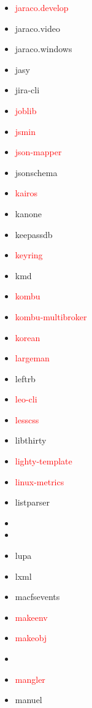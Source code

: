 \documentclass{l4proj}
\begin{document}
\begin{appendices}
{\begin{itemize}
\item\textcolor{red}{jaraco.develop}
\item jaraco.video
\item jaraco.windows
\item jasy
\item jira-cli
\end{itemize}
}%
\clearpage
\noindent\parbox[t]{0.32\textwidth}{\raggedright%
\begin{itemize}
\item\textcolor{red}{joblib}
\item\textcolor{red}{jsmin}
\item\textcolor{red}{json-mapper}
\item jsonschema
\item\textcolor{red}{kairos}
\item kanone
\item keepassdb
\item\textcolor{red}{keyring}
\item kmd
\item\textcolor{red}{kombu}
\item\textcolor{red}{kombu-multibroker}
\item\textcolor{red}{korean}
\item\textcolor{red}{largeman}
\item leftrb
\item\textcolor{red}{leo-cli}
\item\textcolor{red}{lesscss}
\item libthirty
\item\textcolor{red}{lighty-template}
\item\textcolor{red}{linux-metrics}
\item listparser
\item {}
\item {}
\item lupa
\item lxml
\item macfsevents
\item\textcolor{red}{makeenv}
\item\textcolor{red}{makeobj}
\item\textcolor{red}{}
\item\textcolor{red}{mangler}
\item manuel
\end{itemize}
}%
\noindent\parbox[t]{0.32\textwidth}{\raggedright%
\begin{itemize}

\end{itemize}}
\end{appendices}
\end{document}
